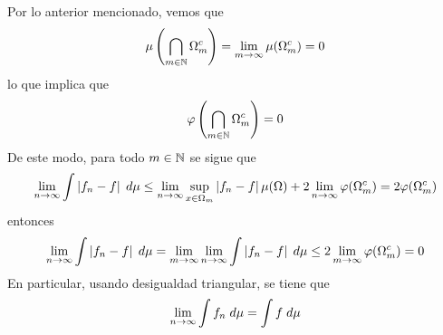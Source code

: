 \documentclass{article}
\begin{document}
Por lo anterior mencionado, vemos que
\begin{equation*}
    \mu\left(\bigcap_{m\in\mathbb{N}}\Omega_{m}^{c}\right)=\lim\limits_{m\to\infty}\mu(\Omega_{m}^{c})=0
\end{equation*}
lo que implica que
\begin{equation*}
    \varphi\left(\bigcap_{m\in\mathbb{N}}\Omega_{m}^{c}\right)=0
\end{equation*}
De este modo, para todo $m\in\mathbb{N}$ se sigue que
\begin{equation*}
    \lim\limits_{n\to\infty}\int\left|f_{n}-f \right|\hspace{1mm}d\mu
    \leq \lim\limits_{n\to\infty}\sup_{x\in\Omega_{m}}\left|f_{n}-f \right|\mu(\Omega)
    +2\lim\limits_{n\to\infty}\varphi(\Omega_{m}^{c})=2\varphi(\Omega_{m}^{c})
\end{equation*}
entonces
\begin{equation*}
    \lim\limits_{n\to\infty}\int\left|f_{n}-f \right|\hspace{1mm}d\mu
    =\lim\limits_{m\to\infty}\lim\limits_{n\to\infty}\int\left|f_{n}-f \right|\hspace{1mm}d\mu
    \leq2\lim\limits_{m\to\infty}\varphi(\Omega_{m}^{c})=0
\end{equation*}
En particular, usando desigualdad triangular, se tiene que
\begin{equation*}
    \lim\limits_{n\to\infty}\int f_{n}\hspace{1mm}d\mu=\int f\hspace{1mm}d\mu
\end{equation*}
\end{document}
